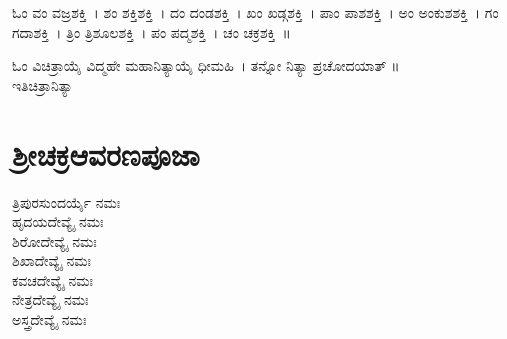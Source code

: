 ಓಂ ವಂ ವಜ್ರಶಕ್ತಿ~।  ಶಂ ಶಕ್ತಿಶಕ್ತಿ~।  ದಂ ದಂಡಶಕ್ತಿ~।  ಖಂ ಖಡ್ಗಶಕ್ತಿ~।  ಪಾಂ ಪಾಶಶಕ್ತಿ~।  ಅಂ ಅಂಕುಶಶಕ್ತಿ~।  ಗಂ ಗದಾಶಕ್ತಿ~।  ತ್ರಿಂ ತ್ರಿಶೂಲಶಕ್ತಿ~।  ಪಂ ಪದ್ಮಶಕ್ತಿ~।  ಚಂ ಚಕ್ರಶಕ್ತಿ~॥

ಓಂ ವಿಚಿತ್ರಾಯೈ ವಿದ್ಮಹೇ ಮಹಾನಿತ್ಯಾಯೈ ಧೀಮಹಿ~। ತನ್ನೋ ನಿತ್ಯಾ ಪ್ರಚೋದಯಾತ್ ॥\\
ಇತಿಚಿತ್ರಾನಿತ್ಯಾ

\section{ಶ್ರೀಚಕ್ರಆವರಣಪೂಜಾ}
 ತ್ರಿಪುರಸುಂದರ್ಯೈ ನಮಃ\\
 ಹೃದಯದೇವ್ಯೈ ನಮಃ\\
 ಶಿರೋದೇವ್ಯೈ ನಮಃ\\
 ಶಿಖಾದೇವ್ಯೈ ನಮಃ\\
 ಕವಚದೇವ್ಯೈ ನಮಃ\\
 ನೇತ್ರದೇವ್ಯೈ ನಮಃ\\
 ಅಸ್ತ್ರದೇವ್ಯೈ ನಮಃ

